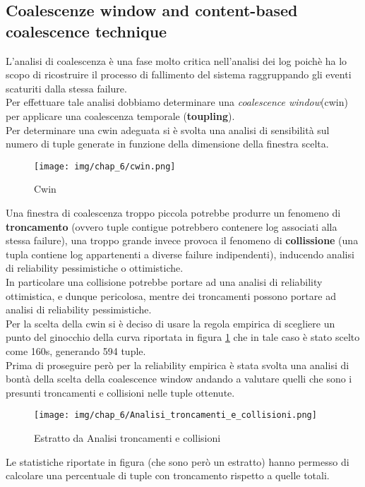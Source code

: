 \subsection{Coalescenze window and content-based coalescence technique}
L'analisi di coalescenza è una fase molto critica nell'analisi dei log poichè ha lo scopo di ricostruire il processo di fallimento del sistema raggruppando gli eventi scaturiti dalla stessa failure.\\
Per effettuare tale analisi dobbiamo determinare una \textit{coalescence window}(cwin) per applicare una coalescenza temporale (\textbf{toupling}).\\
Per determinare una cwin adeguata si è svolta una analisi di sensibilità sul numero di tuple generate in funzione della dimensione della finestra scelta.
 \begin{figure}[H]
    \centering
    \texttt{[image: img/chap\_6/cwin.png]}
    \caption{Cwin}
    \label{fig:cwindow}
\end{figure}
\noindent
Una finestra di coalescenza troppo piccola potrebbe produrre un fenomeno di \textbf{troncamento} (ovvero tuple contigue potrebbero contenere log associati alla stessa failure), una troppo grande invece provoca il fenomeno di \textbf{collissione} (una tupla contiene log appartenenti a diverse failure indipendenti), inducendo analisi di reliability pessimistiche o ottimistiche.\\
In particolare una collisione potrebbe portare ad una analisi di reliability ottimistica, e dunque pericolosa, mentre dei troncamenti possono portare ad analisi di reliability pessimistiche.\\
Per la scelta della cwin si è deciso di usare la regola empirica di scegliere un punto del ginocchio della curva riportata in figura \ref{fig:cwindow} che in tale caso è stato scelto come 160s, generando 594 tuple.\\
Prima di proseguire però per la reliability empirica è stata svolta una analisi di bontà della scelta della coalescence window andando a valutare quelli che sono i presunti troncamenti e collisioni nelle tuple ottenute.\\
 \begin{figure}[H]
    \centering
    \texttt{[image: img/chap\_6/Analisi\_troncamenti\_e\_collisioni.png]}
    \caption{Estratto da Analisi troncamenti e collisioni}
    \label{fig:AnalTroncCollision}
\end{figure}
\noindent
Le statistiche riportate in figura (che sono però un estratto) hanno permesso di calcolare una percentuale di tuple con troncamento rispetto a quelle totali.\\
